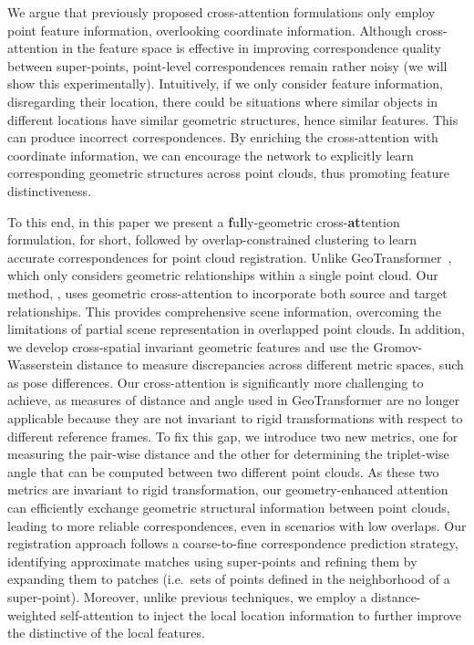 We argue that previously proposed cross-attention formulations only employ point feature information, overlooking coordinate information.
Although cross-attention in the feature space is effective in improving correspondence quality between super-points, point-level correspondences remain rather noisy (we will show this experimentally).
Intuitively, if we only consider feature information, disregarding their location, there could be situations where similar objects in different locations have similar geometric structures, hence similar features. 
This can produce incorrect correspondences. 
By enriching the cross-attention with coordinate information, we can encourage the network to explicitly learn corresponding geometric structures across point clouds, thus promoting feature distinctiveness.

To this end, in this paper we present a \textbf{f}u\textbf{l}ly-geometric cross-\textbf{at}tention formulation, \ourmethod for short, followed by overlap-constrained clustering to learn accurate correspondences for point cloud registration.
Unlike GeoTransformer~\cite{qin2022geometric}, which only considers geometric relationships within a single point cloud. Our method, \ourmethod, uses geometric cross-attention to incorporate both source and target relationships. This provides comprehensive scene information, overcoming the limitations of partial scene representation in overlapped point clouds. In addition, we develop cross-spatial invariant geometric features and use the Gromov-Wasserstein distance to measure discrepancies across different metric spaces, such as pose differences.
Our cross-attention is significantly more challenging to achieve, as measures of distance and angle used in GeoTransformer are no longer applicable because they are not invariant to rigid transformations with respect to different reference frames.
To fix this gap, we introduce two new metrics, one for measuring the pair-wise distance and the other for determining the triplet-wise angle that can be computed between two different point clouds.
As these two metrics are invariant to rigid transformation, our geometry-enhanced attention can efficiently exchange geometric structural information between point clouds, leading to more reliable correspondences, even in scenarios with low overlaps.
Our registration approach follows a coarse-to-fine correspondence prediction strategy, identifying approximate matches using super-points and refining them by expanding them to patches (i.e.~sets of points defined in the neighborhood of a super-point).
Moreover, unlike previous techniques, we employ a distance-weighted self-attention to inject the local location information to further improve the distinctive of the local features.

